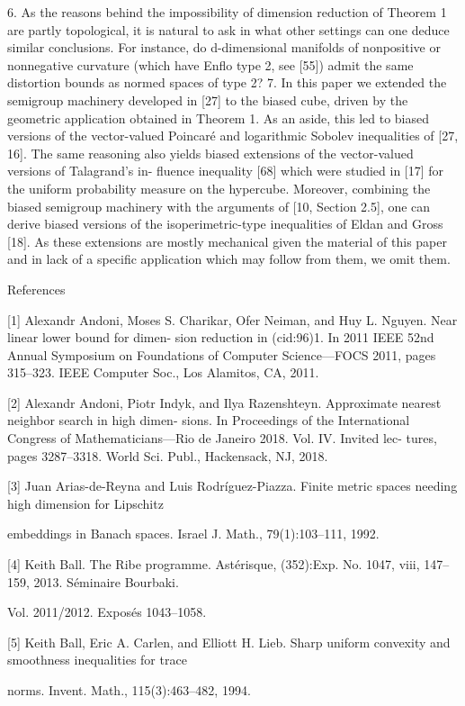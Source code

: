 {6. As the reasons behind the impossibility of dimension reduction of Theorem 1 are partly
topological, it is natural to ask in what other settings can one deduce similar conclusions. For
instance, do d-dimensional manifolds of nonpositive or nonnegative curvature (which have
Enﬂo type 2, see [55]) admit the same distortion bounds as normed spaces of type 2?
7. In this paper we extended the semigroup machinery developed in [27] to the biased cube,
driven by the geometric application obtained in Theorem 1. As an aside, this led to biased
versions of the vector-valued Poincaré and logarithmic Sobolev inequalities of [27, 16]. The
same reasoning also yields biased extensions of the vector-valued versions of Talagrand’s in-
ﬂuence inequality [68] which were studied in [17] for the uniform probability measure on the
hypercube. Moreover, combining the biased semigroup machinery with the arguments of [10,
Section 2.5], one can derive biased versions of the isoperimetric-type inequalities of Eldan and
Gross [18]. As these extensions are mostly mechanical given the material of this paper and in
lack of a speciﬁc application which may follow from them, we omit them.

References

[1] Alexandr Andoni, Moses S. Charikar, Ofer Neiman, and Huy L. Nguyen. Near linear lower bound for dimen-
sion reduction in (cid:96)1. In 2011 IEEE 52nd Annual Symposium on Foundations of Computer Science—FOCS 2011,
pages 315–323. IEEE Computer Soc., Los Alamitos, CA, 2011.

[2] Alexandr Andoni, Piotr Indyk, and Ilya Razenshteyn. Approximate nearest neighbor search in high dimen-
sions. In Proceedings of the International Congress of Mathematicians—Rio de Janeiro 2018. Vol. IV. Invited lec-
tures, pages 3287–3318. World Sci. Publ., Hackensack, NJ, 2018.

[3] Juan Arias-de-Reyna and Luis Rodríguez-Piazza. Finite metric spaces needing high dimension for Lipschitz

embeddings in Banach spaces. Israel J. Math., 79(1):103–111, 1992.

[4] Keith Ball. The Ribe programme. Astérisque, (352):Exp. No. 1047, viii, 147–159, 2013. Séminaire Bourbaki.

Vol. 2011/2012. Exposés 1043–1058.

[5] Keith Ball, Eric A. Carlen, and Elliott H. Lieb. Sharp uniform convexity and smoothness inequalities for trace

norms. Invent. Math., 115(3):463–482, 1994.

}
